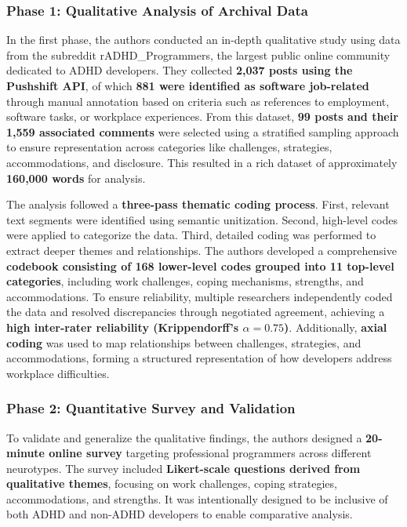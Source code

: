 \subsubsection{Phase 1: Qualitative Analysis of Archival Data}
In the first phase, the authors conducted an in-depth qualitative study using data from the subreddit r\/ADHD\_Programmers, the largest public online community dedicated to ADHD developers. They collected \textbf{2,037 posts using the Pushshift API}, of which \textbf{881 were identified as software job-related} through manual annotation based on criteria such as references to employment, software tasks, or workplace experiences. From this dataset, \textbf{99 posts and their 1,559 associated comments} were selected using a stratified sampling approach to ensure representation across categories like challenges, strategies, accommodations, and disclosure. This resulted in a rich dataset of approximately \textbf{160,000 words} for analysis.

The analysis followed a \textbf{three-pass thematic coding process}. First, relevant text segments were identified using semantic unitization. Second, high-level codes were applied to categorize the data. Third, detailed coding was performed to extract deeper themes and relationships. The authors developed a comprehensive \textbf{codebook consisting of 168 lower-level codes grouped into 11 top-level categories}, including work challenges, coping mechanisms, strengths, and accommodations. To ensure reliability, multiple researchers independently coded the data and resolved discrepancies through negotiated agreement, achieving a \textbf{high inter-rater reliability (Krippendorff’s $\alpha = 0.75$)}. Additionally, \textbf{axial coding} was used to map relationships between challenges, strategies, and accommodations, forming a structured representation of how developers address workplace difficulties.

\subsubsection{Phase 2: Quantitative Survey and Validation}
To validate and generalize the qualitative findings, the authors designed a \textbf{20-minute online survey} targeting professional programmers across different neurotypes. The survey included \textbf{Likert-scale questions derived from qualitative themes}, focusing on work challenges, coping strategies, accommodations, and strengths. It was intentionally designed to be inclusive of both ADHD and non-ADHD developers to enable comparative analysis.

